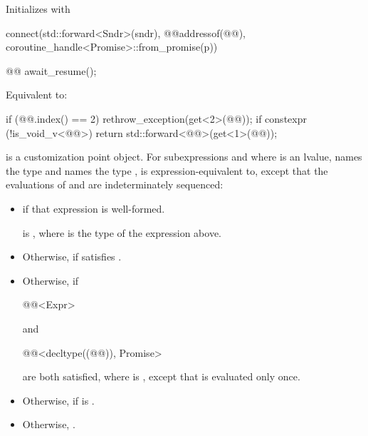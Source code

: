 \begin{itemdescr}
\pnum
\effects
Initializes  with
\begin{codeblock}
connect(std::forward<Sndr>(sndr),
        @@{addressof(@@), coroutine_handle<Promise>::from_promise(p)})
\end{codeblock}
\end{itemdescr}

\begin{itemdecl}
@@ await_resume();
\end{itemdecl}

\begin{itemdescr}
\pnum
\effects
Equivalent to:
\begin{codeblock}
if (@@.index() == 2)
  rethrow_exception(get<2>(@@));
if constexpr (!is_void_v<@@>)
  return std::forward<@@>(get<1>(@@));
\end{codeblock}
\end{itemdescr}

\pnum
{} is a customization point object.
For subexpressions  and 
where  is an lvalue,
 names the type  and
 names the type ,
 is expression-equivalent to,
except that the evaluations of  and 
are indeterminately sequenced:
\begin{itemize}
\item
{} if that expression is well-formed.

\mandates
{} is ,
where  is the type of the expression above.
\item
Otherwise, 
if 
satisfies .
\item
Otherwise, 
if
\begin{codeblock}
@@<Expr>
\end{codeblock}
and
\begin{codeblock}
@@<decltype((@@)), Promise>
\end{codeblock}
are both satisfied, where  is
,
except that  is evaluated only once.
\item
Otherwise, 
if  is .
\item
Otherwise, .
\end{itemize}

